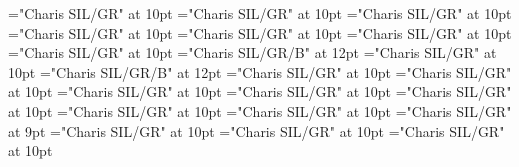 \documentclass[gps1,twoside]{article}
\begin{document}
\font\spanspanvisiblevariantentryrefsminorentrycomplexbefore="Charis SIL/GR" at 10pt
\font\visiblevariantentryrefsminorentrycomplexafter="Charis SIL/GR" at 10pt
\font\variantentrytypevariantentrytypevariantentrytypesvisiblevariantentryrefvisiblevariantentryrefsminorentrycomplexbefore="Charis SIL/GR" at 10pt
\font\variantentrytypesvisiblevariantentryrefvisiblevariantentryrefsminorentrycomplexafter="Charis SIL/GR" at 10pt
\font\spanspanabbreviationvariantentrytypevariantentrytypesvisiblevariantentryrefvisiblevariantentryrefsminorentrycomplexbefore="Charis SIL/GR" at 10pt
\font\spanabbreviationvariantentrytypevariantentrytypesvisiblevariantentryrefvisiblevariantentryrefsminorentrycomplexlastchildafter="Charis SIL/GR" at 10pt
\font{}="Charis SIL/GR" at 10pt
\font\spanbzhheadwordreferencedentryreferencedentriesvisiblevariantentryrefvisiblevariantentryrefsminorentrycomplex="Charis SIL/GR/B" at 12pt
\font\spanspanheadwordreferencedentryreferencedentriesvisiblevariantentryrefvisiblevariantentryrefsminorentrycomplexbefore="Charis SIL/GR" at 10pt
\font\spanheadwordreferencedentryreferencedentriesvisiblevariantentryrefvisiblevariantentryrefsminorentrycomplex="Charis SIL/GR/B" at 12pt
\font\spanspandefinitionorglossreferencedentryreferencedentriesvisiblevariantentryrefvisiblevariantentryrefsminorentrycomplexbefore="Charis SIL/GR" at 10pt
\font\spandefinitionorglossreferencedentryreferencedentriesvisiblevariantentryrefvisiblevariantentryrefsminorentrycomplexfirstchildbefore="Charis SIL/GR" at 10pt
\font\spanspansummaryvisiblevariantentryrefvisiblevariantentryrefsminorentrycomplexbefore="Charis SIL/GR" at 10pt
\font\spansummaryvisiblevariantentryrefvisiblevariantentryrefsminorentrycomplexfirstchildbefore="Charis SIL/GR" at 10pt
\font\spanspancomplexformentryrefsminorentrycomplexbefore="Charis SIL/GR" at 10pt
\font\complexformentryrefsminorentrycomplexbefore="Charis SIL/GR" at 10pt
\font\complexformentryrefsminorentrycomplexafter="Charis SIL/GR" at 10pt
\font\complexformtypecomplexformtypecomplexformtypescomplexformentryrefcomplexformentryrefsminorentrycomplexbefore="Charis SIL/GR" at 9pt
\font\complexformtypescomplexformentryrefcomplexformentryrefsminorentrycomplexafter="Charis SIL/GR" at 10pt
\font\spanspanabbreviationcomplexformtypecomplexformtypescomplexformentryrefcomplexformentryrefsminorentrycomplexbefore="Charis SIL/GR" at 10pt
\font\spanabbreviationcomplexformtypecomplexformtypescomplexformentryrefcomplexformentryrefsminorentrycomplexlastchildafter="Charis SIL/GR" at 10pt
\end{document}

